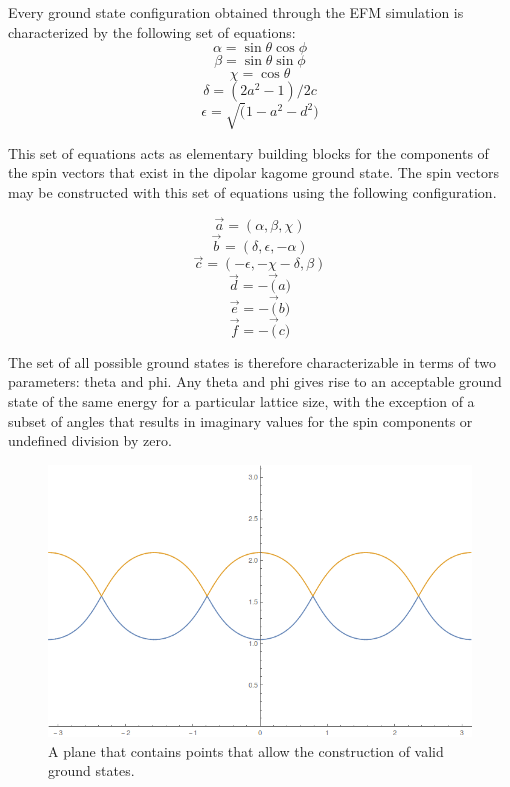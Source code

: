 \clearpage
Every ground state configuration obtained through the EFM simulation is characterized by the following set of equations:
\begin{equation}
\label{eqn:rel_a}
\alpha = \sin{\theta} \cos{\phi}
\end{equation}
\begin{equation}
\label{eqn:rel_b}
\beta = \sin{\theta} \sin{\phi}
\end{equation}
\begin{equation}
\label{eqn:rel_c}
\chi = \cos{\theta}
\end{equation}
\begin{equation}
\label{eqn:rel_d}
\delta = (2a^2-1)/2c
\end{equation}
\begin{equation}
\label{eqn:rel_e}
\epsilon = \sqrt(1-a^2-d^2)
\end{equation}

This set of equations acts as elementary building blocks for the components of the spin vectors that exist in the dipolar kagome ground state. The spin vectors may be constructed with this set of equations using the following configuration.

$$\overrightarrow{a} = (\alpha, \beta, \chi)$$
$$\overrightarrow{b} = (\delta, \epsilon, -\alpha)$$
$$\overrightarrow{c} = (-\epsilon, -\chi-\delta, \beta)$$
$$\overrightarrow{d} =-\overrightarrow(a)$$
$$\overrightarrow{e} =-\overrightarrow(b)$$
$$\overrightarrow{f} =-\overrightarrow(c)$$


The set of all possible ground states is therefore characterizable in terms of two parameters: theta and phi. Any theta and phi gives rise to an acceptable ground state of the same energy for a particular lattice size, with the exception of a subset of angles that results in imaginary values for the spin components or undefined division by zero.

\begin{figure}
	\includegraphics[width=\linewidth]{img/degeneracyplanefull.png}
	\caption{A plane that contains points that allow the construction of valid ground states.}
	\label{fig:degenplanefull}
\end{figure}


